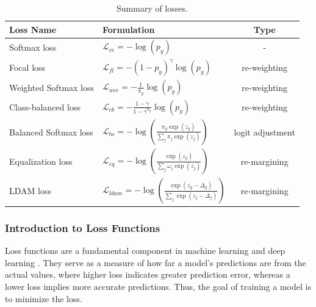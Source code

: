 \begin{table}[H]
    \centering
    \caption{Summary of losses.}
    \label{tab:loss_summary}
    \begin{tabular}{|l|l|c|}
    \hline
    \textbf{Loss Name}       & \textbf{Formulation}                                                & \textbf{Type}        \\ \hline
    Softmax loss \cite{pytorch_crossentropy}             & $\mathcal{L}_{ce} = - \log(p_y)$                                              & -                   \\
    Focal loss \cite{lin2018focallossdenseobject}     & $\mathcal{L}_{fl} = -(1 - p_y)^\gamma \log(p_y)$                             & re-weighting        \\
    Weighted Softmax loss \cite{zhang2023deep}    & $\mathcal{L}_{wce} = - \frac{1}{\pi_y} \log(p_y)$                           & re-weighting        \\
    Class-balanced loss \cite{cui2019classbalancedlossbasedeffective} & $\mathcal{L}_{cb} = - \frac{1 - \gamma}{1 - \gamma^{n_y}} \log(p_y)$         & re-weighting        \\
    Balanced Softmax loss \cite{ren2020balancedmetasoftmaxlongtailedvisual} & $\mathcal{L}_{bs} = - \log\left( \frac{\pi_y \exp(z_y)}{\sum_j \pi_j \exp(z_j)} \right)$ & logit adjustment        \\
    Equalization loss \cite{tan2020equalizationlosslongtailedobject} & $\mathcal{L}_{eq} = - \log\left( \frac{\exp(z_y)}{\sum_j \omega_j \exp(z_j)} \right)$    & re-margining        \\
    LDAM loss \cite{cao2019learningimbalanceddatasetslabeldistributionaware}      & $\mathcal{L}_{ldam} = - \log\left( \frac{\exp(z_y - \Delta_y)}{\sum_j \exp(z_j - \Delta_j)} \right)$ & re-margining        \\
    \hline
    \end{tabular}
\end{table}



\subsubsection{Introduction to Loss Functions}
\label{sec:intro_losses}
Loss functions are a fundamental component in machine learning and deep learning \cite{zhang2023dive,Goodfellow-et-al-2016}. They serve as a measure of how far a model's predictions are from the actual values, where higher loss indicates greater prediction error, whereas a lower loss implies more accurate predictions. Thus, the goal of training a model is to minimize the loss. 

